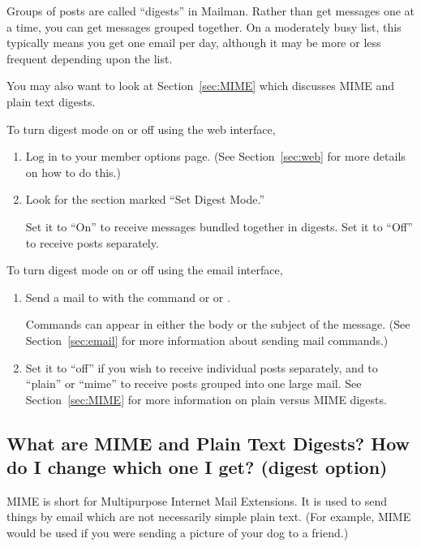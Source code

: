 \documentclass{howto}
\begin{document}
Groups of posts are called ``digests'' in Mailman.  Rather than get messages
one at a time, you can get messages grouped together.  On a moderately busy
list, this typically means you get one email per day, although it may be
more or less frequent depending upon the list.

You may also want to look at Section~\ref{sec:MIME} which discusses MIME
and plain text digests.

To turn digest mode on or off using the web interface,
\begin{enumerate}
	\item Log in to your member options page.  (See Section~\ref{sec:web} 
	for more details on how to do this.)
	\item Look for the section marked ``Set Digest Mode.''  

	Set it to ``On'' to 
	receive messages bundled together in digests.  Set it to ``Off'' to 
	receive posts separately.
\end{enumerate}

To turn digest mode on or off using the email interface,
\begin{enumerate} 
   \item Send a mail to  with the command
    or  or .
   
   Commands can appear
   in either the body or the subject of the message.  (See
   Section~\ref{sec:email} for more information about sending mail
   commands.)
   \item Set it to ``off'' if you wish to receive individual posts separately,
	and to ``plain'' or ``mime'' to receive posts grouped into one large mail.
	See Section~\ref{sec:MIME} for more information on plain versus MIME
	digests.
\end{enumerate}


\subsection{What are MIME and Plain Text Digests?  How do I change which one
I get? (digest option)\label{sec:MIME}}

MIME is short for Multipurpose Internet Mail Extensions.  It is used to 
send things by email which are not necessarily simple plain text.  (For 
example, MIME would be used if you were sending a picture of your dog to 
a friend.)  
\end{document}
